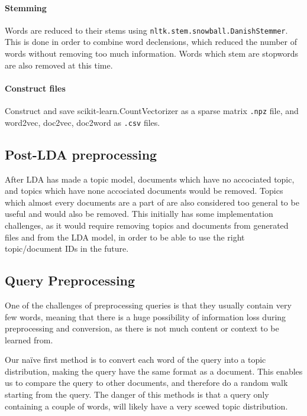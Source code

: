 \paragraph{Stemming}
Words are reduced to their stems using \texttt{nltk.stem.snowball.DanishStemmer}. This is done in order to combine word declensions, which reduced the number of words without removing too much information.
Words which stem are stopwords are also removed at this time.

\paragraph{Construct files}
Construct and save scikit-learn.CountVectorizer as a sparse matrix \texttt{.npz} file, and word2vec, doc2vec, doc2word as \texttt{.csv} files.


\subsection{Post-LDA preprocessing}
After LDA has made a topic model, documents which have no accociated topic, and topics which have none accociated documents would be removed.
Topics which almost every documents are a part of are also considered too general to be useful and would also be removed.
This initially has some implementation challenges, as it would require removing topics and documents from generated files and from the LDA model, in order to be able to use the right topic/document IDs in the future.

\subsection{Query Preprocessing}
One of the challenges of preprocessing queries is that they usually contain very few words, meaning that there is a huge possibility of information loss during preprocessing and conversion, as there is not much content or context to be learned from.

Our naïve first method is to convert each word of the query into a topic distribution, making the query have the same format as a document. This enables us to compare the query to other documents, and therefore do a random walk starting from the query.
The danger of this methods is that a query only containing a couple of words, will likely have a very scewed topic distribution.